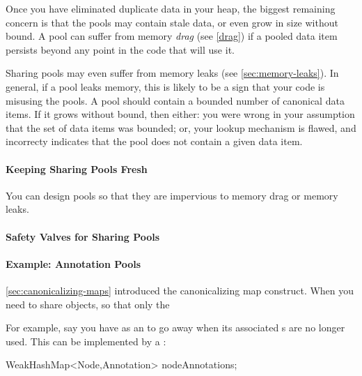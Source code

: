 Once you have eliminated duplicate data in your heap, the biggest remaining
concern is that the pools may contain stale data, or even grow in size without
bound. A pool can suffer from memory \emph{drag} (see \autoref{drag}) if a
pooled data item persists beyond any point in the code that will use it.

Sharing pools may even suffer from memory leaks (see
\autoref{sec:memory-leaks}). In general, if a pool leaks memory, this is likely
to be a sign that your code is misusing the pools. A pool should contain a
bounded number of canonical data items. If it grows without bound, then either:
you were wrong in your assumption that the set of data items was bounded; or,
your lookup mechanism is flawed, and incorrecty indicates that the pool does not
contain a given data item.

\paragraph{Keeping Sharing Pools Fresh}
You can design pools so that they are impervious to memory drag or memory leaks.

\paragraph{Safety Valves for Sharing Pools}


\paragraph{Example: Annotation Pools}
\autoref{sec:canonicalizing-maps} introduced the canonicalizing map construct.
When you need to share objects, so that only the 

For example, say you have as an  to go away when its
associated s are no longer used. This can be implemented by a
:
\begin{shortlisting}
  WeakHashMap<Node,Annotation> nodeAnnotations;
\end{shortlisting}

